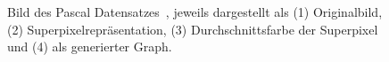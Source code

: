 \begin{figure}[t]
\centering
{}
  \caption[\gls{Pascal}]{Bild des \gls{Pascal} Datensatzes~\cite{pascal_voc}, jeweils dargestellt als (1) Originalbild, (2) Superpixelrepräsentation, (3) Durchschnittsfarbe der Superpixel und (4) als generierter Graph.}
\label{fig:pascal_voc}
\end{figure}

